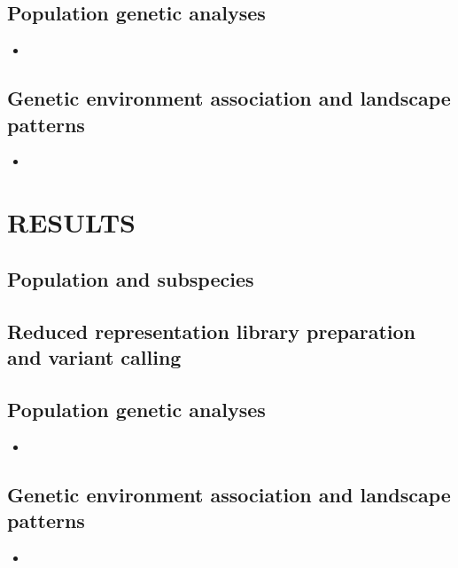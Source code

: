 \documentclass[letterpaper, 12pt]{article}
\begin{document}
\subsection*{Population genetic analyses}

\begin{itemize}
    \item 
\end{itemize}

\subsection*{Genetic environment association and landscape patterns}

\begin{itemize}
    \item 
\end{itemize}



\section*{RESULTS}

\subsection*{Population and subspecies}

\subsection*{Reduced representation library preparation and variant calling}

\subsection*{Population genetic analyses}

\begin{itemize}
    \item 
\end{itemize}

\subsection*{Genetic environment association and landscape patterns}

\begin{itemize}
    \item 
\end{itemize}
\end{document}
